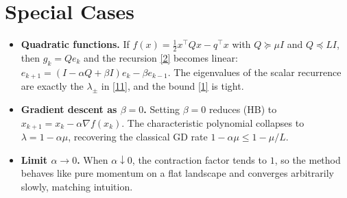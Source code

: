 \documentclass[11pt]{article}
\newcommand{\grad}{\nabla}
\begin{document}
\section*{Special Cases}
\begin{itemize}
\item \textbf{Quadratic functions.}  
If $f(x)=\frac12 x^{\top}Qx-q^{\top}x$ with $Q\succeq\mu I$ and $Q\preceq L I$,
then $g_{k}=Qe_{k}$ and the recursion \eqref{2} becomes linear:
$e_{k+1}= (I-\alpha Q+\beta I)e_{k}-\beta e_{k-1}$.  
The eigenvalues of the scalar recurrence are exactly the
$\lambda_{\pm}$ in \eqref{11}, and the bound \eqref{1} is tight.

\item \textbf{Gradient descent as $\beta=0$.}  
Setting $\beta=0$ reduces (HB) to $x_{k+1}=x_{k}-\alpha\grad f(x_{k})$.
The characteristic polynomial collapses to $\lambda=1-\alpha\mu$,
recovering the classical GD rate $1-\alpha\mu\le1-\mu/L$.

\item \textbf{Limit $\alpha\to0$.}  
When $\alpha\downarrow0$, the contraction factor tends to $1$,
so the method behaves like pure momentum on a flat landscape and
converges arbitrarily slowly, matching intuition.
\end{itemize}
\end{document}
